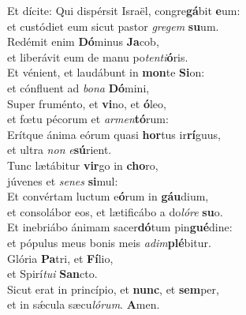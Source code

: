 \evenverse Et dícite: Qui dispérsit Israël, congre\textbf{gá}bit \textbf{e}um:~\*\\
\evenverse et custódiet eum sicut pastor \textit{gre}\textit{gem} \textbf{su}um.\\
\oddverse Redémit enim \textbf{Dó}minus \textbf{Ja}cob,~\*\\
\oddverse et liberávit eum de manu po\textit{ten}\textit{ti}\textbf{ó}ris.\\
\evenverse Et vénient, et laudábunt in \textbf{mon}te \textbf{Si}on:~\*\\
\evenverse et cónfluent ad \textit{bo}\textit{na} \textbf{Dó}mini,\\
\oddverse Super fruménto, et \textbf{vi}no, et \textbf{ó}leo,~\*\\
\oddverse et fœtu pécorum et \textit{ar}\textit{men}\textbf{tó}rum:\\
\evenverse Erítque ánima eórum quasi \textbf{hor}tus ir\textbf{rí}guus,~\*\\
\evenverse et ultra \textit{non} \textit{e}\textbf{sú}rient.\\
\oddverse Tunc lætábitur \textbf{vir}go in \textbf{cho}ro,~\*\\
\oddverse júvenes et \textit{se}\textit{nes} \textbf{si}mul:\\
\evenverse Et convértam luctum e\textbf{ó}rum in \textbf{gáu}dium,~\*\\
\evenverse et consolábor eos, et lætificábo a do\textit{ló}\textit{re} \textbf{su}o.\\
\oddverse Et inebriábo ánimam sacer\textbf{dó}tum pin\textbf{gué}dine:~\*\\
\oddverse et pópulus meus bonis meis \textit{a}\textit{dim}\textbf{plé}bitur.\\
\evenverse Glória \textbf{Pa}tri, et \textbf{Fí}lio,~\*\\
\evenverse et Spirí\textit{tu}\textit{i} \textbf{San}cto.\\
\oddverse Sicut erat in princípio, et \textbf{nunc}, et \textbf{sem}per,~\*\\
\oddverse et in sǽcula sæcu\textit{ló}\textit{rum}. \textbf{A}men.\\
